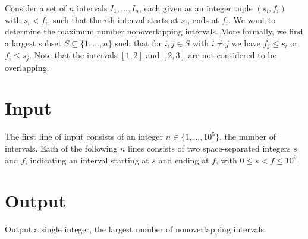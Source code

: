 

\noindent
Consider a set of $n$ intervals $I_1,\ldots, I_n$, each given as an integer tuple $(s_i, f_i)$ with $s_i<f_i$, such that the $i$th interval starts at $s_i$, ends at $f_i$.
We want to determine the maximum number nonoverlapping intervals.
More formally, we find a largest subset $S\subseteq \{1,\ldots,n\}$ such that for $i, j\in S$ with $i\neq j$ we have $f_j \leq s_i$ or $f_i\leq s_j$. 
Note that the intervals $[1,2]$ and $[2,3]$ are not considered to be overlapping.

\section*{Input}

The first line of input consists of an integer $n\in\{1,\ldots, 10^5\}$, the number of intervals.
Each of the following $n$ lines consists of two space-separated integers $s$ and $f$, indicating an interval starting at $s$ and ending at $f$, with $0\leq s<f\leq 10^9$.


\section*{Output}

Output a single integer, the largest number of nonoverlapping intervals.
